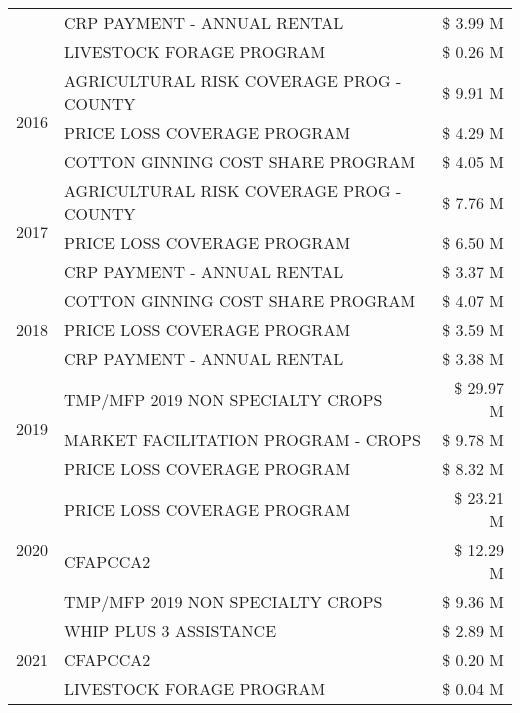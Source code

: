 \begin{tabular}{llr}
 & CRP PAYMENT - ANNUAL RENTAL & \$ 3.99 M \\
 & LIVESTOCK FORAGE PROGRAM & \$ 0.26 M \\
\cline{1-3}
\multirow[t]{3}{*}{2016} & AGRICULTURAL RISK COVERAGE PROG - COUNTY & \$ 9.91 M \\
 & PRICE LOSS COVERAGE PROGRAM & \$ 4.29 M \\
 & COTTON GINNING COST SHARE PROGRAM & \$ 4.05 M \\
\cline{1-3}
\multirow[t]{3}{*}{2017} & AGRICULTURAL RISK COVERAGE PROG - COUNTY & \$ 7.76 M \\
 & PRICE LOSS COVERAGE PROGRAM & \$ 6.50 M \\
 & CRP PAYMENT - ANNUAL RENTAL & \$ 3.37 M \\
\cline{1-3}
\multirow[t]{3}{*}{2018} & COTTON GINNING COST SHARE PROGRAM & \$ 4.07 M \\
 & PRICE LOSS COVERAGE PROGRAM & \$ 3.59 M \\
 & CRP PAYMENT - ANNUAL RENTAL & \$ 3.38 M \\
\cline{1-3}
\multirow[t]{3}{*}{2019} & TMP/MFP 2019 NON SPECIALTY CROPS & \$ 29.97 M \\
 & MARKET FACILITATION PROGRAM - CROPS & \$ 9.78 M \\
 & PRICE LOSS COVERAGE PROGRAM & \$ 8.32 M \\
\cline{1-3}
\multirow[t]{3}{*}{2020} & PRICE LOSS COVERAGE PROGRAM & \$ 23.21 M \\
 & CFAPCCA2 & \$ 12.29 M \\
 & TMP/MFP 2019 NON SPECIALTY CROPS & \$ 9.36 M \\
\cline{1-3}
\multirow[t]{3}{*}{2021} & WHIP PLUS 3 ASSISTANCE & \$ 2.89 M \\
 & CFAPCCA2 & \$ 0.20 M \\
 & LIVESTOCK FORAGE PROGRAM & \$ 0.04 M \\
\cline{1-3}
\bottomrule
\end{tabular}
